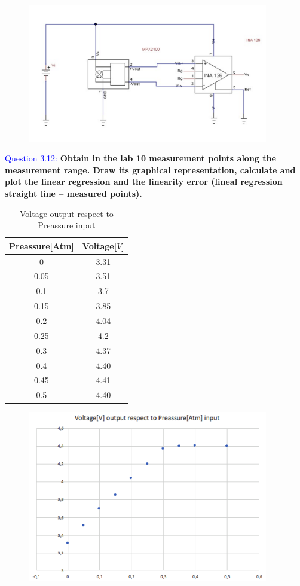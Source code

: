 \documentclass[12pt, a4papre]{article}
\begin{document}
	\begin{figure}[H]
		\begin{center}
		\includegraphics[width=105mm]{CirquitWP3.png}
		\end{center}
	\end{figure}
	
	\newpage
	\textcolor{blue}{Question 3.12:} \textbf{Obtain in the lab 10 measurement points along the measurement range. Draw its graphical representation, calculate and plot the linear regression and the linearity error (lineal regression straight line – measured points). }
	
	\begin{table}[H]
	\centering
	\begin{tabular}{||c c ||} 
	 \hline
		 Preassure[Atm] & Voltage[$V$] \\ [0.5ex] 
	 \hline\hline
	 	0 		& 3.31 \\
		 0.05 	& 3.51  \\ 
		 0.1		& 3.7  \\ 
		 0.15		& 3.85\\
		 0.2	 	& 4.04  \\ 
		 0.25 	& 4.2\\
		 0.3	 	& 4.37  \\ 
		 0.4 		& 4.40 \\
		 0.45 	& 4.41  \\ 
		 0.5 		& 4.40 \\ [1ex] 
	 \hline
	\end{tabular}
	\caption{Voltage output respect to Preassure input}
	\end{table}
	
	
	\begin{figure}[H]
		\begin{center}
		\includegraphics[width=105mm]{ExcelGraph.png}
		\end{center}
	\end{figure}
	
\end{document}
